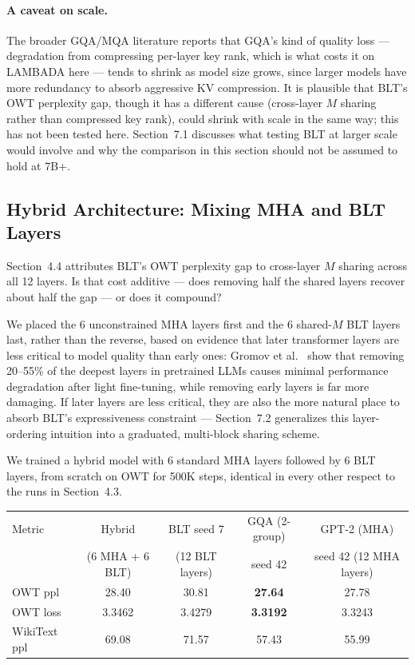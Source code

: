 \documentclass[11pt]{article}
\begin{document}
\paragraph{A caveat on scale.} The broader GQA/MQA literature reports that GQA's kind of quality loss --- degradation from compressing per-layer key rank, which is what costs it on LAMBADA here --- tends to shrink as model size grows, since larger models have more redundancy to absorb aggressive KV compression. It is plausible that BLT's OWT perplexity gap, though it has a different cause (cross-layer $M$ sharing rather than compressed key rank), could shrink with scale in the same way; this has not been tested here. Section~7.1 discusses what testing BLT at larger scale would involve and why the comparison in this section should not be assumed to hold at 7B+.

\subsection{Hybrid Architecture: Mixing MHA and BLT Layers}

Section~4.4 attributes BLT's OWT perplexity gap to cross-layer $M$ sharing across all 12 layers. Is that cost additive --- does removing half the shared layers recover about half the gap --- or does it compound?

We placed the 6 unconstrained MHA layers first and the 6 shared-$M$ BLT layers last, rather than the reverse, based on evidence that later transformer layers are less critical to model quality than early ones: Gromov et al.~\cite{gromov2024} show that removing 20--55\% of the deepest layers in pretrained LLMs causes minimal performance degradation after light fine-tuning, while removing early layers is far more damaging. If later layers are less critical, they are also the more natural place to absorb BLT's expressiveness constraint --- Section~7.2 generalizes this layer-ordering intuition into a graduated, multi-block sharing scheme.

We trained a hybrid model with 6 standard MHA layers followed by 6 BLT layers, from scratch on OWT for 500K steps, identical in every other respect to the runs in Section~4.3.

\begin{center}
\begin{tabular}{lcccc}
\toprule
Metric & Hybrid & BLT seed 7 & GQA (2-group) & GPT-2 (MHA) \\
 & (6 MHA + 6 BLT) & (12 BLT layers) & seed 42 & seed 42 (12 MHA layers) \\
\midrule
OWT ppl & 28.40 & 30.81 & \textbf{27.64} & 27.78 \\
OWT loss & 3.3462 & 3.4279 & \textbf{3.3192} & 3.3243 \\
WikiText ppl & 69.08 & 71.57 & 57.43 & 55.99 \\
\bottomrule
\end{tabular}
\end{center}
\end{document}

